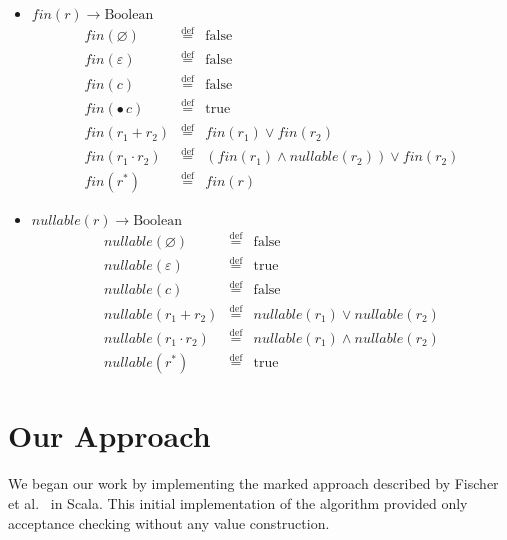 \documentclass[12pt]{article}
\newcommand{\Marked}[1]{\bullet\,#1}
\newcommand{\fin}{\textit{fin}}
\newcommand{\nullable}{\textit{nullable}}
\begin{document}
\begin{itemize}
\item $\fin(r) \to \text{Boolean}$
  \[
  \begin{array}{rcl}
  \fin(\varnothing)              & \stackrel{\text{def}}{=} & \text{false} \\
  \fin(\varepsilon)              & \stackrel{\text{def}}{=} & \text{false} \\
  \fin(c)                        & \stackrel{\text{def}}{=} & \text{false} \\
  \fin(\Marked{c})               & \stackrel{\text{def}}{=} & \text{true} \\
  \fin(r_1 + r_2)                & \stackrel{\text{def}}{=} & \fin(r_1) \lor \fin(r_2) \\ 
  \fin(r_1 \cdot r_2)            & \stackrel{\text{def}}{=} & (\fin(r_1) \land \nullable(r_2)) \lor \fin(r_2) \\
  \fin(r^*)                      & \stackrel{\text{def}}{=} & \fin(r)  
  \end{array}
  \]

\item $\nullable(r) \to \text{Boolean}$
  \[
  \begin{array}{rcl}
  \nullable(\varnothing)         & \stackrel{\text{def}}{=} & \text{false} \\
  \nullable(\varepsilon)         & \stackrel{\text{def}}{=} & \text{true} \\
  \nullable(c)                   & \stackrel{\text{def}}{=} & \text{false} \\
  \nullable(r_1 + r_2)           & \stackrel{\text{def}}{=} & \nullable(r_1) \lor \nullable(r_2) \\ 
  \nullable(r_1 \cdot r_2)       & \stackrel{\text{def}}{=} & \nullable(r_1) \land \nullable(r_2) \\
  \nullable(r^*)                 & \stackrel{\text{def}}{=} & \text{true}
  \end{array}
  \]
\end{itemize}


\section{Our Approach}

We began our work by implementing the marked approach described by Fischer et al.~\cite{Fischer2010} in Scala. 
This initial implementation of the algorithm provided only acceptance checking without any value construction.  
\end{document}
